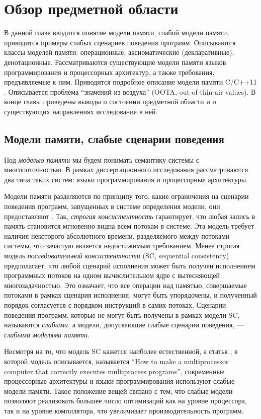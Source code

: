 \chapter{Обзор предметной области} \label{sec:overview}
В данной главе вводится понятие модели памяти, слабой модели памяти,
приводится примеры слабых сценариев поведения программ. Описываются
классы моделей памяти: операционные, аксиоматические (декларативные),
денотационные.
Рассматриваются существующие модели памяти языков программирования и
процессорных архитектур, а также требования, предъявляемые к ним.
Приводится подробное описание модели памяти C/C++11 \cite{Batty-al:POPL11}.
Описывается проблема ``значений из воздуха'' (OOTA, out-of-thin-air values).
В конце главы приведены выводы о состоянии предметной области и о существующих
направлениях исследования в ней.

\section{Модели памяти, слабые сценарии поведения}
Под \emph{моделью памяти} мы будем понимать семантику системы с многопоточностью.
В рамках диссертационного исследования рассматриваются два типа таких систем:
языки программирования и процессорные архитектуры.

Модели памяти разделяются по принципу того, какие ограничения на сценарии поведения
программ, запущенных в системе определения модели, они предоставляют \cite{Kshemkalyani-Singhal:2011}.
Так, \emph{строгая консистентность} гарантирует, что любая запись в память становится мгновенно видна
всем потокам в системе. Эта модель требует наличия некоторого абсолютного времени, разделяемого между потоками системы,
что зачастую является недостижимым требованием. Менее строгая модель \emph{последовательной консистентности} \cite{Lamport:TC79}
(SC, sequential consistency)
предполагает, что любой сценарий исполнения может быть получен исполнением программных потоков на одном вычислительном
ядре с вытесняющей многозадачностью. Это означает, что все операции над памятью, совершаемые потоками в рамках сценария исполнения,
могут быть упорядочены, и полученный порядок согласуется с порядком инструкций в самих потоках.
Сценарии поведения программ, которые не могут быть получены в рамках модели SC, называются
\emph{слабыми}, а модели, допускающие слабые сценарии поведения, --- \emph{слабыми моделями памяти}.

Несмотря на то, что модель SC кажется наиболее естественной, а статья \cite{Lamport:TC79},
в которой модель описывается, называется ``How to make a multiprocessor computer that correctly executes multiprocess programs'',
современные процессорные архитектуры и языки программирования используют слабые модели памяти. Такое положение вещей
связано с тем, что слабые модели позволяют реализовать большее число оптимизаций как на уровне процессора, так и на уровне
компилятора, что увеличивает производительность программ.

